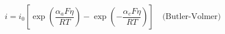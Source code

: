 \documentclass[preview]{standalone}
\begin{document}
\[i = i_0 \left[\exp\!\left(\frac{\alpha_a F \eta}{RT}\right) - \exp\!\left(-\frac{\alpha_c F \eta}{RT}\right)\right] \quad \text{(Butler-Volmer)} \tag{2.12}\]
\end{document}
